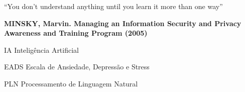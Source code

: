 \documentclass[12pt,oneside,a4paper,chapter=TITLE, english, french,	spanish, brazil]{abntex2-logatti}
\begin{document}
\begin{epigrafe}
“You don't understand anything until you learn it more than one way”

\textbf{MINSKY, Marvin. Managing an Information Security and Privacy Awareness and Training
Program (2005)}
\end{epigrafe}



\setlength{\absparsep}{18pt} %







\listoffigures*
\cleardoublepage






\begin{siglas}
  \item[IA] Inteligência Artificial
  \item[EADS] Escala de Ansiedade, Depressão e Stress
  \item[PLN] Processamento de Linguagem Natural
\end{siglas}
\end{document}
